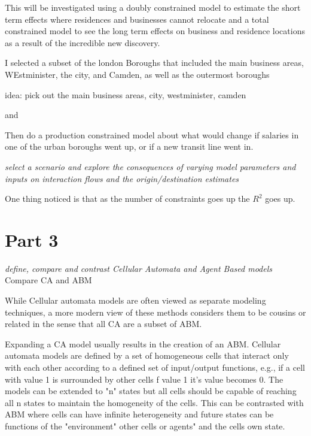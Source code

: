 \documentclass[11pt]{article} %
\begin{document}
This will be investigated using a doubly constrained model to estimate the short term effects where residences and businesses cannot relocate and a total constrained model to see the long term effects on business and residence locations as a result of the incredible new discovery. 


I selected a subset of the london Boroughs that included the main business areas, WEstminister, the city, and Camden, as well as the outermost boroughs

idea: pick out the main business areas, city, westminister, camden 

and 

Then do a production constrained model about what would change if salaries in one of the urban boroughs went up, or if a new transit line went in. 

\textit{select a scenario and explore the consequences of varying model parameters and inputs on interaction flows and the origin/destination estimates}

One thing noticed is that as the number of constraints goes up the $R^2$ goes up. 







\section{Part 3}

\textit{define, compare and contrast Cellular Automata and Agent Based models}
Compare CA and ABM

While Cellular automata models are often viewed as separate modeling techniques, a more modern view of these methods considers them to be cousins or related in the sense that all CA are a subset of ABM. 

Expanding a CA model usually results in the creation of an ABM.  Cellular automata models are defined by a set of homogeneous cells that interact only with each other according to a defined set of input/output functions, e.g., if a cell with value 1 is surrounded by other cells f value 1 it's value becomes 0. The models can be extended to "n" states but all cells should be capable of reaching all n states to maintain the homogeneity of the cells. This can be contrasted with ABM where cells can have infinite heterogeneity and future states can be functions of the "environment" other cells or agents" and the cells own state. 
\end{document}
